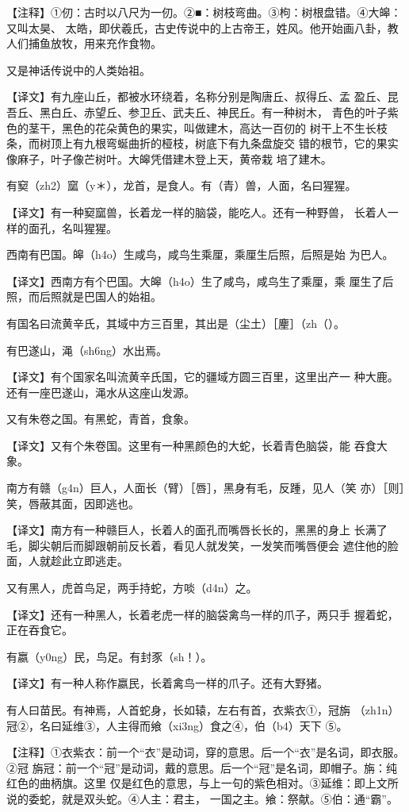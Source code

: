 \documentclass[a4paper,12pt,UTF8,twoside]{ctexbook}
\begin{document}
【注释】①仞：古时以八尺为一仞。②■：树枝弯曲。③枸：树根盘错。④大皞：又叫太昊、 太皓，即伏羲氏，古史传说中的上古帝王，姓风。他开始画八卦，教人们捕鱼放牧，用来充作食物。

又是神话传说中的人类始祖。

【译文】有九座山丘，都被水环绕着，名称分别是陶唐丘、叔得丘、孟 盈丘、昆吾丘、黑白丘、赤望丘、参卫丘、武夫丘、神民丘。有一种树木， 青色的叶子紫色的茎干，黑色的花朵黄色的果实，叫做建木，高达一百仞的 树干上不生长枝条，而树顶上有九根弯蜒曲折的桠枝，树底下有九条盘旋交 错的根节，它的果实像麻子，叶子像芒树叶。大皞凭借建木登上天，黄帝栽 培了建木。

有窫（zh2）窳（y＊），龙首，是食人。有（青）兽，人面，名曰猩猩。

【译文】有一种窫窳兽，长着龙一样的脑袋，能吃人。还有一种野兽， 长着人一样的面孔，名叫猩猩。

西南有巴国。皞（h4o）生咸鸟，咸鸟生乘厘，乘厘生后照，后照是始 为巴人。

【译文】西南方有个巴国。大皞（h4o）生了咸鸟，咸鸟生了乘厘，乘 厘生了后照，而后照就是巴国人的始祖。

有国名曰流黄辛氏，其域中方三百里，其出是（尘土）［麈］（zh（）。

有巴遂山，渑（sh6ng）水出焉。

【译文】有个国家名叫流黄辛氏国，它的疆域方圆三百里，这里出产一 种大鹿。还有一座巴遂山，渑水从这座山发源。

又有朱卷之国。有黑蛇，青首，食象。

【译文】又有个朱卷国。这里有一种黑颜色的大蛇，长着青色脑袋，能 吞食大象。

南方有赣（g4n）巨人，人面长（臂）［唇］，黑身有毛，反踵，见人（笑 亦）［则］笑，唇蔽其面，因即逃也。

【译文】南方有一种赣巨人，长着人的面孔而嘴唇长长的，黑黑的身上 长满了毛，脚尖朝后而脚跟朝前反长着，看见人就发笑，一发笑而嘴唇便会 遮住他的脸面，人就趁此立即逃走。

又有黑人，虎首鸟足，两手持蛇，方啖（d4n）之。

【译文】还有一种黑人，长着老虎一样的脑袋禽鸟一样的爪子，两只手 握着蛇，正在吞食它。

有嬴（y0ng）民，鸟足。有封豕（sh！）。

【译文】有一种人称作嬴民，长着禽鸟一样的爪子。还有大野猪。

有人曰苗民。有神焉，人首蛇身，长如辕，左右有首，衣紫衣①，冠旃 （zh1n）冠②，名曰延维③，人主得而飨（xi3ng）食之④，伯（b4）天下 ⑤。

【注释】①衣紫衣：前一个“衣”是动词，穿的意思。后一个“衣”是名词，即衣服。②冠 旃冠：前一个“冠”是动词，戴的意思。后一个“冠”是名词，即帽子。旃：纯红色的曲柄旗。这里 仅是红色的意思，与上一句的紫色相对。③延维：即上文所说的委蛇，就是双头蛇。④人主：君主， 一国之主。飨：祭献。⑤伯：通“霸”。
\end{document}
